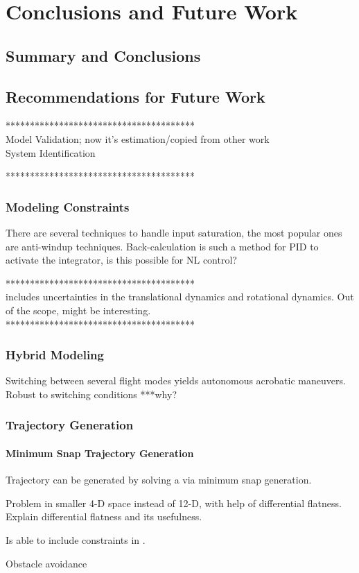 \chapter{Conclusions and Future Work}\label{ch:conclusion}
\section{Summary and Conclusions}

\section{Recommendations for Future Work}\label{ch:future}
***************************************\\
Model Validation; now it's estimation/copied from other work\\ 
System Identification

***************************************\\
\subsection{Modeling Constraints}
There are several techniques to handle input saturation, the most popular ones are anti-windup techniques. Back-calculation is such a method for PID to activate the integrator, is this possible for NL control?

***************************************\\
\cite{Goodarzi2013a} includes uncertainties in the translational dynamics and rotational dynamics. Out of the scope, might be interesting.\\
***************************************\\

\subsection{Hybrid Modeling}
Switching between several flight modes yields autonomous acrobatic maneuvers. Robust to switching conditions ***why?\\
\cite{Tang2014}

\subsection{Trajectory Generation}
\subsubsection{Minimum Snap Trajectory Generation}

Trajectory can be generated by solving a  via minimum snap generation.

Problem in smaller 4-D space instead of 12-D, with help of differential flatness. Explain differential flatness and its usefulness.

Is able to include constraints in .

\cite{Mellinger2011}


Obstacle avoidance
